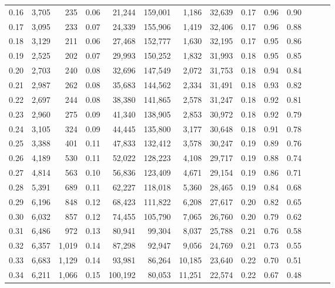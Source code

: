 \begin{tabular}{rrrrrrrrrrrrrr}
0.16 &  3,705 &    235 &  0.06 &   21,244 &  159,001 &   1,186 &  32,639 &  0.17 &  0.96 &      0.90 \\
0.17 &  3,095 &    233 &  0.07 &   24,339 &  155,906 &   1,419 &  32,406 &  0.17 &  0.96 &      0.88 \\
0.18 &  3,129 &    211 &  0.06 &   27,468 &  152,777 &   1,630 &  32,195 &  0.17 &  0.95 &      0.86 \\
0.19 &  2,525 &    202 &  0.07 &   29,993 &  150,252 &   1,832 &  31,993 &  0.18 &  0.95 &      0.85 \\
0.20 &  2,703 &    240 &  0.08 &   32,696 &  147,549 &   2,072 &  31,753 &  0.18 &  0.94 &      0.84 \\
0.21 &  2,987 &    262 &  0.08 &   35,683 &  144,562 &   2,334 &  31,491 &  0.18 &  0.93 &      0.82 \\
0.22 &  2,697 &    244 &  0.08 &   38,380 &  141,865 &   2,578 &  31,247 &  0.18 &  0.92 &      0.81 \\
0.23 &  2,960 &    275 &  0.09 &   41,340 &  138,905 &   2,853 &  30,972 &  0.18 &  0.92 &      0.79 \\
0.24 &  3,105 &    324 &  0.09 &   44,445 &  135,800 &   3,177 &  30,648 &  0.18 &  0.91 &      0.78 \\
0.25 &  3,388 &    401 &  0.11 &   47,833 &  132,412 &   3,578 &  30,247 &  0.19 &  0.89 &      0.76 \\
0.26 &  4,189 &    530 &  0.11 &   52,022 &  128,223 &   4,108 &  29,717 &  0.19 &  0.88 &      0.74 \\
0.27 &  4,814 &    563 &  0.10 &   56,836 &  123,409 &   4,671 &  29,154 &  0.19 &  0.86 &      0.71 \\
0.28 &  5,391 &    689 &  0.11 &   62,227 &  118,018 &   5,360 &  28,465 &  0.19 &  0.84 &      0.68 \\
0.29 &  6,196 &    848 &  0.12 &   68,423 &  111,822 &   6,208 &  27,617 &  0.20 &  0.82 &      0.65 \\
0.30 &  6,032 &    857 &  0.12 &   74,455 &  105,790 &   7,065 &  26,760 &  0.20 &  0.79 &      0.62 \\
0.31 &  6,486 &    972 &  0.13 &   80,941 &   99,304 &   8,037 &  25,788 &  0.21 &  0.76 &      0.58 \\
0.32 &  6,357 &  1,019 &  0.14 &   87,298 &   92,947 &   9,056 &  24,769 &  0.21 &  0.73 &      0.55 \\
0.33 &  6,683 &  1,129 &  0.14 &   93,981 &   86,264 &  10,185 &  23,640 &  0.22 &  0.70 &      0.51 \\
0.34 &  6,211 &  1,066 &  0.15 &  100,192 &   80,053 &  11,251 &  22,574 &  0.22 &  0.67 &      0.48 \\

\end{tabular}
